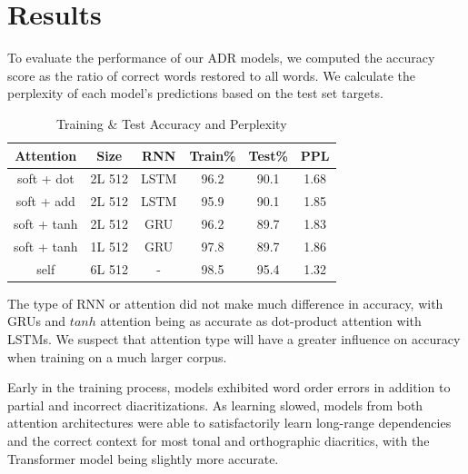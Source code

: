 \documentclass[a4paper]{article}
\begin{document}
\section{Results}
To evaluate the performance of our ADR models, we computed the accuracy score as the ratio of correct words restored to all words. We calculate the perplexity of each model's predictions based on the test set targets.
 \begin{table}[h]
  \caption{Training \& Test Accuracy and Perplexity}
  \label{tab:results}
  \centering
  \begin{tabular}{cccccc}
    \toprule
    \textbf{Attention} & \textbf{Size} & \textbf{RNN} & \textbf{Train\%} & \textbf{Test\%} &\textbf{PPL} \\
    \midrule
    soft + dot & 2L 512 & LSTM & 96.2 & 90.1 & 1.68 \\
    soft + add & 2L 512 & LSTM & 95.9 & 90.1 & 1.85 \\
	soft + tanh & 2L 512 & GRU & 96.2 & 89.7 & 1.83 \\ 
	soft + tanh & 1L 512 & GRU  & 97.8 & 89.7 & 1.86 \\ 
	\midrule
    self & 6L 512   & -  & 98.5 & 95.4 & 1.32 \\
    \bottomrule
  \end{tabular}
\end{table}
The type of RNN or attention did not make much difference in accuracy, with GRUs and $tanh$ attention being as accurate as dot-product attention with LSTMs. We suspect that attention type will have a greater influence on accuracy when training on a much larger corpus. 

Early in the training process, models exhibited word order errors in addition to  partial and incorrect diacritizations. As learning slowed, models from both attention architectures were able to satisfactorily learn long-range dependencies and the correct context for most tonal and orthographic diacritics, with the Transformer model being slightly more accurate. 
\end{document}
